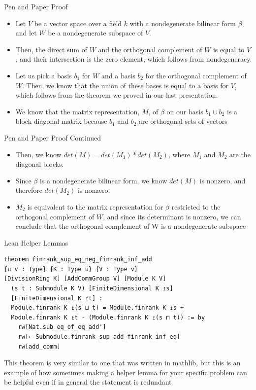 \documentclass[svgnames]{beamer}
\begin{document}
\begin{frame}{Pen and Paper Proof}
\begin{itemize}[<+->]
\item Let $V$ be a vector space over a field $k$ with a nondegenerate bilinear form $\beta$, and let $W$ be a nondegenerate subspace of $V$.
\item Then, the direct sum of $W$ and the orthogonal complement of $W$ is equal to $V$, and their intersection is the zero element, which follows from nondegeneracy.
\item Let us pick a basis $b_1$ for $W$ and a basis $b_2$ for the orthogonal complement of $W$. Then, we know that the union of these bases is equal to a basis for $V$, which follows from the theorem we proved in our last presentation. 
\item We know that the matrix representation, $M$, of $\beta$ on our basis $b_1 \cup b_2$ is a block diagonal matrix because $b_1$ and $b_2$ are orthogonal sets of vectors 
\end{itemize}
\end{frame}

\begin{frame}{Pen and Paper Proof Continued}
\begin{itemize}[<+->]
\item Then, we know $det(M) = det(M_1) * det(M_2)$, where $M_1$ and $M_2$ are the diagonal blocks. 
\item Since $\beta$ is a nondegenerate bilinear form, we know $det(M)$ is nonzero, and therefore $det(M_2)$ is nonzero.
\item $M_2$ is equivalent to the matrix representation for $\beta$ restricted to the orthogonal complement of $W$, and since its determinant is nonzero, we can conclude that the orthogonal complement of W is a nondegenerate subspace 
\end{itemize}
\end{frame}

\begin{frame}[label={sec:orthog_compl},fragile]{Lean Helper Lemmas}

{\scriptsize

\begin{verbatim}
theorem finrank_sup_eq_neg_finrank_inf_add 
{u v : Type} {K : Type u} {V : Type v} 
[DivisionRing K] [AddCommGroup V] [Module K V]
  (s t : Submodule K V) [FiniteDimensional K ↥s] 
  [FiniteDimensional K ↥t] :
  Module.finrank K ↥(s ⊔ t) = Module.finrank K ↥s + 
  Module.finrank K ↥t - (Module.finrank K ↥(s ⊓ t)) := by
    rw[Nat.sub_eq_of_eq_add']
    rw[← Submodule.finrank_sup_add_finrank_inf_eq]
    rw[add_comm]
\end{verbatim}
}
\item This theorem is very similar to one that was written in mathlib, but this is an example of how sometimes making a helper lemma for your specific problem can be helpful even if in general the statement is redundant 
\end{frame}
\end{document}
